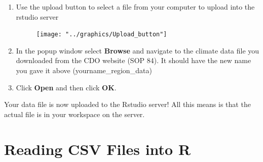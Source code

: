 \documentclass{article}\usepackage[]{graphicx}\usepackage[]{color}
\begin{document}
  \begin{enumerate}
  \item Use the upload button to select a file from your computer to upload into the rstudio server
  \begin{figure}[h]
  \texttt{[image: "../graphics/Upload\_button"]}
  \end{figure}
  \item In the popup window select \textbf{Browse} and navigate to the climate data file you downloaded from the CDO website (SOP 84). It should have the new name you gave it above (yourname\_region\_data)
  \item Click \textbf{Open} and then click \textbf{OK}. 
  
  \end{enumerate}

Your data file is now uploaded to the Rstudio server! All this means is that the actual file is in your workspace on the server. %





\section{Reading CSV Files into R}
\end{document}
